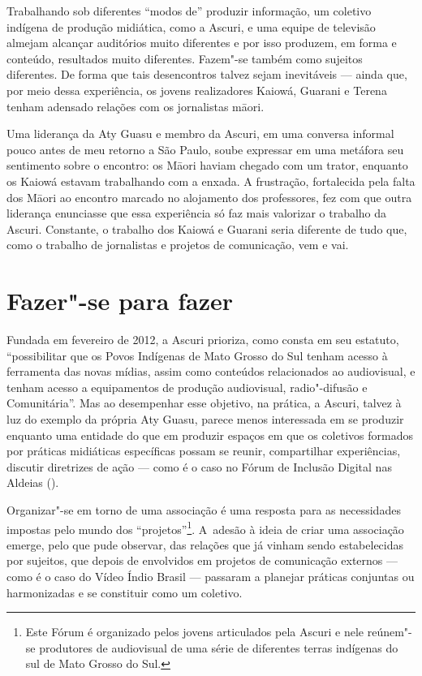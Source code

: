 Trabalhando sob diferentes ``modos de'' produzir informação, um coletivo
indígena de produção midiática, como a Ascuri, e uma equipe de
televisão almejam alcançar auditórios muito diferentes e por isso
produzem, em forma e conteúdo, resultados muito diferentes. Fazem"-se
também como sujeitos diferentes. De forma que tais desencontros talvez
sejam inevitáveis --- ainda que, por meio dessa experiência, os jovens
realizadores Kaiowá, Guarani e Terena tenham adensado relações com os
jornalistas m\=aori.

Uma liderança da Aty Guasu e membro da Ascuri, em uma conversa informal
pouco antes de meu retorno a São Paulo, soube expressar em uma metáfora
seu sentimento sobre o encontro: os M\=aori haviam chegado com um
trator, enquanto os Kaiowá estavam trabalhando com a enxada. A
frustração, fortalecida pela falta dos M\=aori ao encontro marcado no
alojamento dos professores, fez com que outra liderança enunciasse que
essa experiência só faz mais valorizar o trabalho da Ascuri. Constante,
o trabalho dos Kaiowá e Guarani seria diferente de tudo que, como o
trabalho de jornalistas e projetos de comunicação, vem e vai.

\section{Fazer"-se para fazer}

Fundada em fevereiro de 2012, a Ascuri prioriza, como consta em seu
estatuto, ``possibilitar que os Povos Indígenas de Mato
Grosso do Sul tenham acesso à ferramenta das novas mídias, assim como
conteúdos relacionados ao audiovisual, e tenham acesso a equipamentos
de produção audiovisual, radio"-difusão e  Comunitária''.
Mas ao desempenhar esse objetivo, na prática, a Ascuri, talvez à luz do
exemplo da própria Aty Guasu, parece menos interessada em se produzir
enquanto uma entidade do que em produzir espaços em que os coletivos
formados por práticas midiáticas específicas possam se reunir,
compartilhar experiências, discutir diretrizes de ação --- como é o caso
no Fórum de Inclusão Digital nas Aldeias ().

Organizar"-se em torno de uma associação é uma resposta para as
necessidades impostas pelo mundo dos ``projetos''\footnote{Este Fórum é
organizado pelos jovens articulados pela Ascuri e nele reúnem"-se
produtores de audiovisual de uma série de diferentes terras indígenas
do sul de Mato Grosso do Sul. }. A~adesão à ideia de criar uma
associação emerge, pelo que pude observar, das relações que já vinham
sendo estabelecidas por sujeitos, que depois de envolvidos em projetos
de comunicação externos --- como é o caso do Vídeo Índio Brasil ---
passaram a planejar práticas conjuntas ou harmonizadas e se constituir
como um coletivo.

